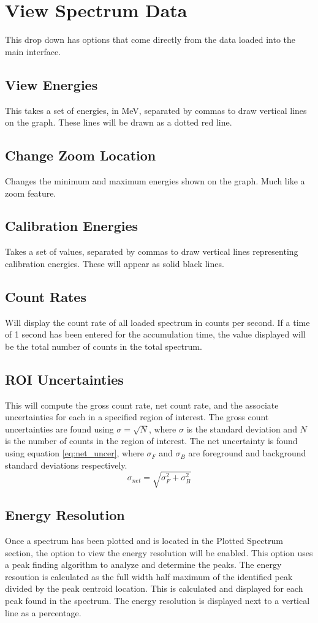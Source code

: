 \section{View Spectrum Data}
	This drop down has options that come directly from the data loaded into the main interface. 

		\subsection{View Energies}
			This takes a set of energies, in MeV, separated by commas to draw vertical lines on the graph. These lines will be drawn as a dotted red line.
		\subsection{Change Zoom Location}
			Changes the minimum and maximum energies shown on the graph. Much like a zoom feature. 
		\subsection{Calibration Energies}
			Takes a set of values, separated by commas to draw vertical lines representing calibration energies. These will appear as solid black lines. 
		\subsection{Count Rates}
			Will display the count rate of all loaded spectrum in counts per second. If a time of 1 second has been entered for the accumulation time, the value displayed will be the total number of counts in the total spectrum.
		\subsection{ROI Uncertainties}
		This will compute the gross count rate, net count rate, and the associate uncertainties for each in a specified region of interest. The gross count uncertainties are found using $\sigma=\sqrt{N}$, where $\sigma$ is the standard deviation and $N$ is the number of counts in the region of interest. The net uncertainty is found using equation \ref{eq:net_uncer}, where $\sigma_F$ and $\sigma_B$ are foreground and background standard deviations respectively.
		\begin{equation}
			\sigma_{net}=\sqrt{\sigma_F^2+\sigma_B^2}
			\label{eq:net_uncer}
		\end{equation}
		
		\subsection{Energy Resolution}
			Once a spectrum has been plotted and is located in the Plotted Spectrum section, the option to view the energy resolution will be enabled. This option uses a peak finding algorithm to analyze and determine the peaks. The energy resoution is calculated as the full width half maximum of the identified peak divided by the peak centroid location. This is calculated and displayed for each peak found in the spectrum. The energy resolution is displayed next to a vertical line as a percentage. 